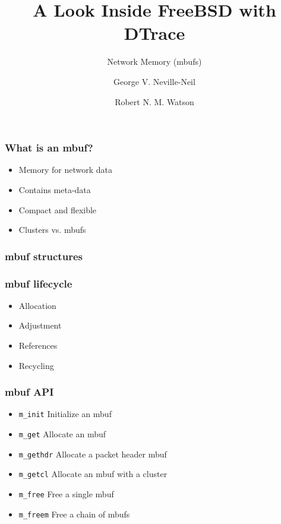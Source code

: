 \documentclass[pdftex]{beamer}
\begin{document}

\title{A Look Inside FreeBSD with DTrace}
\subtitle{Network Memory (mbufs)}
\author[shortname]{George V. Neville-Neil \and Robert N. M. Watson}

\begin{frame}
  \titlepage
\end{frame}

\begin{frame}
  \frametitle{What is an mbuf?}
  \begin{itemize}
  \item Memory for network data 
  \item Contains meta-data
  \item Compact and flexible
  \item Clusters vs. mbufs
  \end{itemize}
\end{frame}

\begin{frame}
  \frametitle{mbuf structures}
  
\end{frame}

\begin{frame}
  \frametitle{mbuf lifecycle}
  \begin{itemize}
  \item Allocation
  \item Adjustment
  \item References
  \item Recycling
  \end{itemize}
\end{frame}

\begin{frame}[fragile]
  \frametitle{mbuf API}
  \begin{itemize}
  \item \verb|m_init| Initialize an mbuf
  \item \verb|m_get| Allocate an mbuf
  \item \verb|m_gethdr| Allocate a packet header mbuf 
  \item \verb|m_getcl| Allocate an mbuf with a cluster
  \item \verb|m_free| Free a single mbuf
  \item \verb|m_freem| Free a chain of mbufs
  \end{itemize}
\end{frame}
\end{document}
